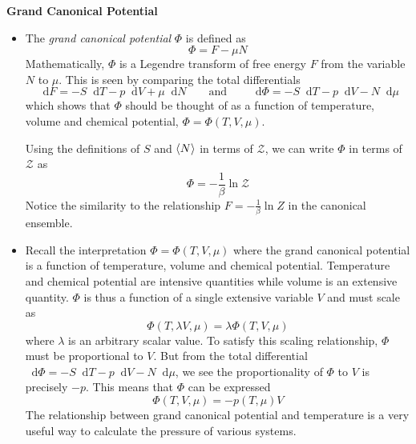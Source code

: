 \documentclass[11pt, a4paper]{article}
\newcommand{\eqtext}[1]{\qquad \text{#1} \qquad}
\newcommand{\diff}{\mathop{}\!\mathrm{d}} %
\begin{document}
\textbf{Grand Canonical Potential}
\begin{itemize}
	\item The \textit{grand canonical potential} $ \Phi $ is defined as
	\begin{equation*}
		\Phi = F - \mu N
	\end{equation*}
	Mathematically, $ \Phi $ is a Legendre transform of free energy $ F $ from the variable $ N $ to $ \mu $. This is seen by comparing the total differentials
	\begin{equation*}
		 \diff F = - S \diff T - p\diff V + \mu \diff N \eqtext{and} \diff \Phi = -S \diff T - p \diff V - N\diff \mu  
	\end{equation*}
	which shows that $ \Phi $ should be thought of as a function of temperature, volume and chemical potential, $ \Phi = \Phi(T, V, \mu) $. 
	
	Using the definitions of $ S $ and $ \expval{N} $ in terms of $ \mathcal{Z} $, we can write $ \Phi $ in terms of $ \mathcal{Z} $ as
	\begin{equation*}
		\Phi = - \frac{1}{\beta} \ln \mathcal{Z}
	\end{equation*}
	Notice the similarity to the relationship $ F = - \frac{1}{\beta} \ln Z $ in the canonical ensemble.
	
	\item Recall the interpretation $ \Phi = \Phi(T, V, \mu) $ where the grand canonical potential is a function of temperature, volume and chemical potential. Temperature and chemical potential are intensive quantities while volume is an extensive quantity. $ \Phi $ is thus a function of a single extensive variable $ V $ and must scale as 
	 \begin{equation*}
	 	\Phi(T, \lambda V, \mu) = \lambda \Phi(T, V, \mu)
	 \end{equation*}
	 where $ \lambda $ is an arbitrary scalar value. To satisfy this scaling relationship, $ \Phi $ must be proportional to $ V $. But from the total differential $ \diff \Phi = -S \diff T - p \diff V - N\diff \mu $, we see the proportionality of $ \Phi $ to $ V $ is precisely $ - p $. This means that $ \Phi $ can be expressed
	 \begin{equation*}
	 	\Phi(T, V, \mu) = -p(T, \mu) V
	 \end{equation*}
	 The relationship between grand canonical potential and temperature is a very useful way to calculate the pressure of various systems.

\end{itemize}
\end{document}
